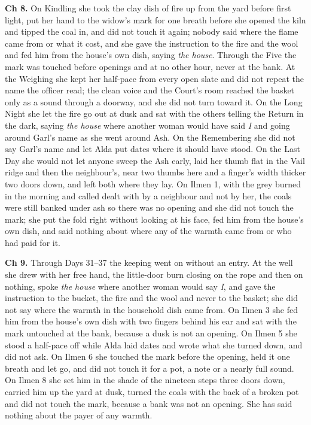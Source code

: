 \documentclass{design/chronicle}
\begin{document}
{\textbf{Ch 8.} On Kindling she took the clay dish of fire up from the yard before first light, put her hand to the widow’s mark for one breath before she opened the kiln and tipped the coal in, and did not touch it again; nobody said where the flame came from or what it cost, and she gave the instruction to the fire and the wool and fed him from the house’s own dish, saying \emph{the house}. Through the Five the mark was touched before openings and at no other hour, never at the bank. At the Weighing she kept her half-pace from every open slate and did not repeat the name the officer read; the clean voice and the Court’s room reached the basket only as a sound through a doorway, and she did not turn toward it. On the Long Night she let the fire go out at dusk and sat with the others telling the Return in the dark, saying \emph{the house} where another woman would have said \emph{I} and going around Garl’s name as she went around Ash. On the Remembering she did not say Garl’s name and let Alda put dates where it should have stood. On the Last Day she would not let anyone sweep the Ash early, laid her thumb flat in the Vail ridge and then the neighbour’s, near two thumbs here and a finger’s width thicker two doors down, and left both where they lay. On Ilmen 1, with the grey burned in the morning and called dealt with by a neighbour and not by her, the coals were still banked under ash so there was no opening and she did not touch the mark; she put the fold right without looking at his face, fed him from the house’s own dish, and said nothing about where any of the warmth came from or who had paid for it.

\textbf{Ch 9.} Through Days 31–37 the keeping went on without an entry. At the well she drew with her free hand, the little-door burn closing on the rope and then on nothing, spoke \emph{the house} where another woman would say \emph{I}, and gave the instruction to the bucket, the fire and the wool and never to the basket; she did not say where the warmth in the household dish came from. On Ilmen 3 she fed him from the house’s own dish with two fingers behind his ear and sat with the mark untouched at the bank, because a dusk is not an opening. On Ilmen 5 she stood a half-pace off while Alda laid dates and wrote what she turned down, and did not ask. On Ilmen 6 she touched the mark before the opening, held it one breath and let go, and did not touch it for a pot, a note or a nearly full sound. On Ilmen 8 she set him in the shade of the nineteen steps three doors down, carried him up the yard at dusk, turned the coals with the back of a broken pot and did not touch the mark, because a bank was not an opening. She has said nothing about the payer of any warmth.

}
\end{document}
